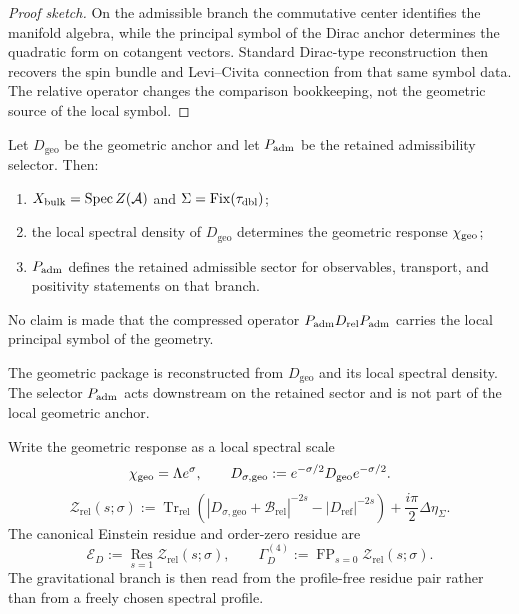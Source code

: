 \begin{proof}[Proof sketch]
On the admissible branch the commutative center identifies the manifold algebra, while the
principal symbol of the Dirac anchor determines the quadratic form on cotangent vectors.
Standard Dirac-type reconstruction then recovers the spin bundle and Levi--Civita connection
from that same symbol data. The relative operator changes the comparison bookkeeping, not the
geometric source of the local symbol.
\end{proof}

\begin{theorem}
\label{thm:retained-branch-from-Padm}
\label{thm:admissible-sector-on-reconstructed-geometry}
\label{thm:full-operator-reconstruction}
Let $D_{\mathrm{geo}}$ be the geometric anchor and let $P_{\mathrm{adm}}$ be the retained
admissibility selector.
Then:
\begin{enumerate}[label=(\roman*), leftmargin=1.5em, topsep=3pt, itemsep=2pt]
\item $X_{\mathrm{bulk}}=\mathrm{Spec}\,Z(\mathcal A)$ and $\Sigma=\mathrm{Fix}(\tau_{\mathrm{dbl}})$;
\item the local spectral density of $D_{\mathrm{geo}}$ determines the geometric response
      $\chi_{\mathrm{geo}}$;
\item $P_{\mathrm{adm}}$ defines the retained admissible sector for observables, transport,
      and positivity statements on that branch.
\end{enumerate}
No claim is made that the compressed operator $P_{\mathrm{adm}} D_{\mathrm{rel}}P_{\mathrm{adm}}$
carries the local principal symbol of the geometry.
\end{theorem}

\begin{corollary}
The geometric package is reconstructed from $D_{\mathrm{geo}}$ and its local spectral density.
The selector $P_{\mathrm{adm}}$ acts downstream on the retained sector and is not part of the
local geometric anchor.
\end{corollary}

\begin{definition}
\label{def:local-spectral-scale}
\label{def:canonical-residues}
Write the geometric response as a local spectral scale
\[
\chi_{\mathrm{geo}}=\Lambda e^\sigma,
\qquad
D_{\sigma,\mathrm{geo}}:=e^{-\sigma/2}D_{\mathrm{geo}}e^{-\sigma/2}.
\]
\[
\mathcal Z_{\mathrm{rel}}(s;\sigma)
:=
\operatorname{Tr}_{\mathrm{rel}}\!\left(
|D_{\sigma,\mathrm{geo}}+\mathcal B_{\mathrm{rel}}|^{-2s}
-|D_{\mathrm{ref}}|^{-2s}
\right)
+\frac{i\pi}{2}\Delta\eta_\Sigma.
\]
The canonical Einstein residue and order-zero residue are
\[
\mathcal E_D
:=
\operatorname*{Res}_{s=1}\mathcal Z_{\mathrm{rel}}(s;\sigma),
\qquad
\Gamma_D^{(4)}
:=
\operatorname{FP}_{s=0}\mathcal Z_{\mathrm{rel}}(s;\sigma).
\]
The gravitational branch is then read from the profile-free residue pair rather than from a freely
chosen spectral profile.
\end{definition}

